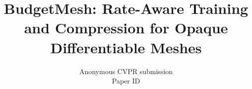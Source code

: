 \documentclass[10pt,twocolumn,letterpaper]{article}
\title{BudgetMesh: Rate-Aware Training and Compression for Opaque Differentiable Meshes}
\author{Anonymous CVPR submission\\
Paper ID \cvprPaperID}
\begin{document}
\maketitle






{
    \small
    
    
}
% 
\end{document}
